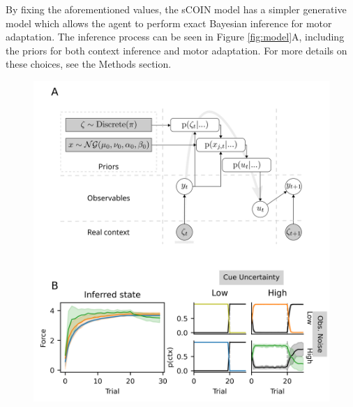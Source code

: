 \documentclass[a4paper,doc,floatsintext,natbib]{apa6}
\def \fref #1{Figure \ref{#1}}     %
\begin{document}
By fixing the aforementioned values, the sCOIN model has a simpler generative model which allows the agent to perform exact Bayesian inference for motor adaptation. The inference process can be seen in \fref{fig:model}A, including the priors for both context inference and motor adaptation. For more details on these choices, see the Methods section.

\begin{figure}
\centering
\includegraphics[]{./figures/figure_1.png}

\end{figure}
\end{document}

